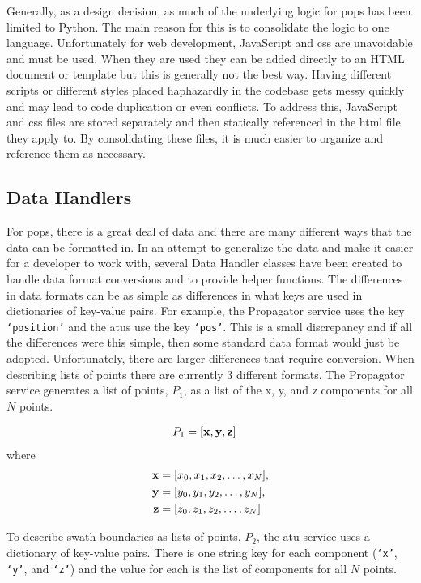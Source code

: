 Generally, as a design decision, as much of the underlying logic for \gls{pops}
has been limited to Python. The main reason for this is to consolidate the
logic to one language. Unfortunately for web development, JavaScript and
\gls{css} are unavoidable and must be used. When they are used they can be
added directly to an HTML document or template but this is generally not the
best way. Having different scripts or different styles placed haphazardly in
the codebase gets messy quickly and may lead to code duplication or even
conflicts. To address this, JavaScript and \gls{css} files are stored
separately and then statically referenced in the \gls{html} file they apply to.
By consolidating these files, it is much easier to organize and reference them
as necessary. 


\subsection{Data Handlers}\label{sec:data_handler}

For \gls{pops}, there is a great deal of data and there are many different ways
that the data can be formatted in. In an attempt to generalize the data and
make it easier for a developer to work with, several Data Handler classes have
been created to handle data format conversions and to provide helper functions.
The differences in data formats can be as simple as differences in what keys
are used in dictionaries of key-value pairs. For example, the Propagator
service uses the key \texttt{`position'} and the \glspl{atu} use the key
\texttt{`pos'}.  This is a small discrepancy and if all the differences were
this simple, then some standard data format would just be adopted.
Unfortunately, there are larger differences that require conversion.  When
describing lists of points there are currently 3 different formats. The
Propagator service generates a list of points, $P_1$, as a list of the x, y,
and z components for all $N$ points. 

\begin{align*}
    P_1 &= [\bm{\mathrm{x}}, \bm{\mathrm{y}}, \bm{\mathrm{z}}] 
\end{align*}
where
\begin{align*}
    \bm{\mathrm{x}} &= [x_0, x_1, x_2, \ldots, x_N],  \\
    \bm{\mathrm{y}} &= [y_0, y_1, y_2, \ldots, y_N],  \\
    \bm{\mathrm{z}} &= [z_0, z_1, z_2, \ldots, z_N]
\end{align*}

To describe swath boundaries as lists of points, $P_2$, the \gls{atu} service
uses a dictionary of key-value pairs. There is one string key for each
component (\texttt{`x'}, \texttt{`y'}, and \texttt{`z'}) and the value for each
is the list of components for all $N$ points. 

